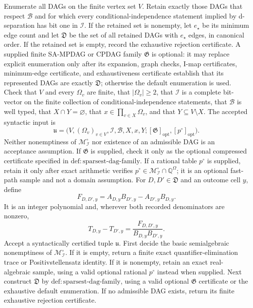 Enumerate all DAGs on the finite vertex set \(V\).  Retain exactly those DAGs that respect \(\mathcal B\) and for which every conditional-independence statement implied by d-separation has bit one in \(\mathcal I\).  If the retained set is nonempty, let \(e_\star\) be its minimum edge count and let \(\mathfrak D\) be the set of all retained DAGs with \(e_\star\) edges, in canonical order.  If the retained set is empty, record the exhaustive rejection certificate.  A supplied finite SA-MPDAG or CPDAG family \(\mathfrak G\) is optional: it may replace explicit enumeration only after its expansion, graph checks, I-map certificates, minimum-edge certificate, and exhaustiveness certificate establish that its represented DAGs are exactly \(\mathfrak D\); otherwise the default enumeration is used.
Check that \(V\) and every \(\Omega_v\) are finite, that \(|\Omega_v|\geq2\), that \(\mathcal I\) is a complete bit-vector on the finite collection of conditional-independence statements, that \(\mathcal B\) is well typed, that \(X\cap Y=\varnothing\), that \(x\in\prod_{v\in X}\Omega_v\), and that \(Y\subseteq V\setminus X\).  The accepted syntactic input is
\[
 \mathfrak u=\bigl(V,(\Omega_v)_{v\in V},\mathcal I,\mathcal B,X,x,Y;
 [\mathfrak G]_{\mathrm{opt}},[p^{\circ}]_{\mathrm{opt}}\bigr).
\]
Neither nonemptiness of \(\mathcal M_{\mathcal I}^{\circ}\) nor existence of an admissible DAG is an acceptance assumption.  If \(\mathfrak G\) is supplied, check it only as the optional compressed certificate specified in \(\mathrm{def{:}sparsest\text{-}dag\text{-}family}\).  If a rational table \(p^{\circ}\) is supplied, retain it only after exact arithmetic verifies \(p^{\circ}\in\mathcal M_{\mathcal I}^{\circ}\cap\mathbb Q^{\Omega}\); it is an optional fast-path sample and not a domain assumption.
For \(D,D'\in\mathfrak D\) and an outcome cell \(y\), define
\[
 F_{D,D',y}=A_{D,y}B_{D',y}-A_{D',y}B_{D,y}.
\]
It is an integer polynomial and, wherever both recorded denominators are nonzero,
\[
 T_{D,y}-T_{D',y}=\frac{F_{D,D',y}}{B_{D,y}B_{D',y}}.
\]
Accept a syntactically certified tuple \(\mathfrak u\).  First decide the basic semialgebraic nonemptiness of \(\mathcal M_{\mathcal I}^{\circ}\).  If it is empty, return a finite exact quantifier-elimination trace or Positivstellensatz identity.  If it is nonempty, retain an exact real-algebraic sample, using a valid optional rational \(p^{\circ}\) instead when supplied.  Next construct \(\mathfrak D\) by \(\mathrm{def{:}sparsest\text{-}dag\text{-}family}\), using a valid optional \(\mathfrak G\) certificate or the exhaustive default enumeration.  If no admissible DAG exists, return its finite exhaustive rejection certificate.

